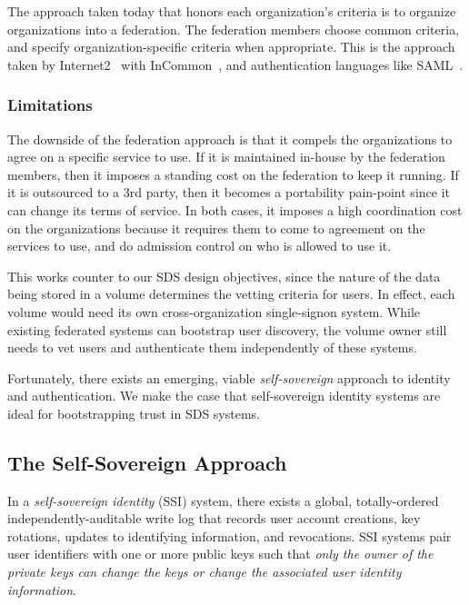The approach taken today that honors each organization's criteria is to organize
organizations into a federation.  The federation members choose common criteria,
and specify organization-specific criteria when appropriate.  This is the
approach taken by Internet2~\cite{internet2} with InCommon~\cite{incommon}, and
authentication languages like SAML~\cite{saml}.

\subsubsection{Limitations}

The downside of the federation approach is that it compels the organizations to
agree on a specific service to use. If it is maintained in-house by the
federation members, then it imposes a standing cost on the federation to keep it
running.  If it is outsourced to a 3rd party, then it becomes a portability
pain-point since it can change its terms of service.  In both cases, it imposes
a high coordination cost on the organizations because it requires them to come
to agreement on the services to use, and do admission control on who is allowed
to use it.

This works counter to our SDS design objectives, since the nature of the data being stored
in a volume determines the vetting criteria for users.  In effect, each volume
would need its own cross-organization single-signon system.  While existing
federated systems can bootstrap user discovery, the volume owner still
needs to vet users and authenticate them independently of these systems.

Fortunately, there exists an emerging, viable \emph{self-sovereign} approach
to identity and authentication.  We make the case that self-sovereign identity
systems are ideal for bootstrapping trust in SDS systems.

\subsection{The Self-Sovereign Approach}

In a \emph{self-sovereign identity} (SSI) system, there exists a global,
totally-ordered independently-auditable write log that records user account creations, key rotations,
updates to identifying information, and revocations.  SSI systems 
pair user identifiers with one or more public keys such that \emph{only the 
owner of the private keys can 
change the keys or change the associated user identity information}.

